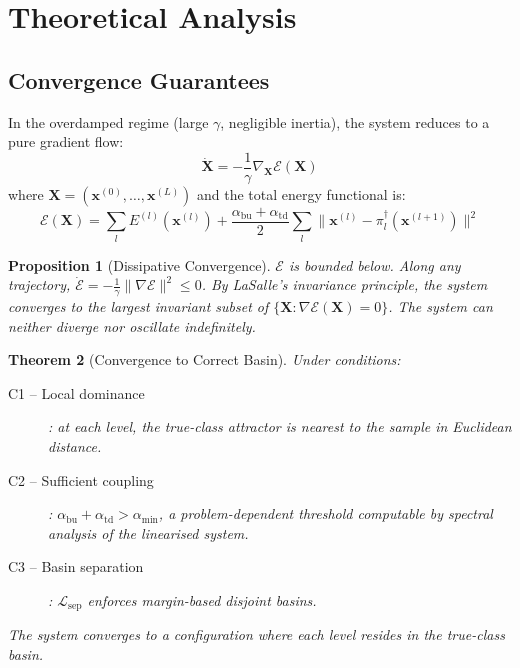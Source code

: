 \documentclass[11pt,a4paper]{article}
\newtheorem{theorem}{Theorem}[section]
\newtheorem{proposition}[theorem]{Proposition}
\begin{document}
\section{Theoretical Analysis}
\label{sec:theory}

\subsection{Convergence Guarantees}
\label{sec:theory:convergence}

In the overdamped regime (large $\gamma$, negligible inertia), the system reduces to a pure
gradient flow:
\begin{equation}
  \dot{\mathbf{X}} = -\frac{1}{\gamma}\nabla_{\mathbf{X}} \mathcal{E}(\mathbf{X})
\end{equation}
where $\mathbf{X} = (\mathbf{x}^{(0)}, \ldots, \mathbf{x}^{(L)})$ and the total energy functional is:
\begin{equation}
  \mathcal{E}(\mathbf{X}) = \sum_l E^{(l)}(\mathbf{x}^{(l)})
  + \frac{\alpha_{\mathrm{bu}} + \alpha_{\mathrm{td}}}{2}
    \sum_l \|\mathbf{x}^{(l)} - \pi_l^\dagger(\mathbf{x}^{(l+1)})\|^2
\label{eq:lyapunov}
\end{equation}

\begin{proposition}[Dissipative Convergence]
$\mathcal{E}$ is bounded below.  Along any trajectory,
$\dot{\mathcal{E}} = -\frac{1}{\gamma}\|\nabla \mathcal{E}\|^2 \le 0$.
By LaSalle's invariance principle, the system converges to the largest invariant subset of
$\{\mathbf{X} : \nabla \mathcal{E}(\mathbf{X}) = 0\}$.  The system can neither diverge nor
oscillate indefinitely.
\label{prop:convergence}
\end{proposition}

\begin{theorem}[Convergence to Correct Basin]
Under conditions:
\begin{description}
  \item[C1 -- Local dominance]: at each level, the true-class attractor is nearest to the sample
        in Euclidean distance.
  \item[C2 -- Sufficient coupling]:
        $\alpha_{\mathrm{bu}} + \alpha_{\mathrm{td}} > \alpha_{\min}$,
        a problem-dependent threshold computable by spectral analysis of the linearised system.
  \item[C3 -- Basin separation]: $\mathcal{L}_{\mathrm{sep}}$ enforces margin-based disjoint basins.
\end{description}
The system converges to a configuration where each level resides in the true-class basin.
\label{thm:correct_basin}
\end{theorem}
\end{document}
